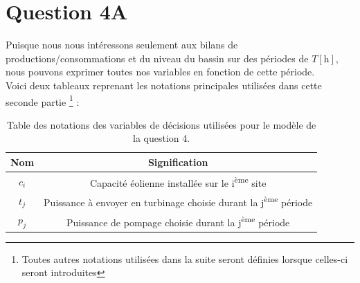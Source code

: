\documentclass{article}
\newcommand{\unit}[1]{[\mathrm{#1}]}
\begin{document}
\section*{Question 4A}
Puisque nous nous intéressons seulement aux bilans de productions/consommations et du niveau du bassin
sur des périodes de $T \unit{h}$, nous pouvons exprimer toutes nos variables en fonction de cette période.\\
Voici deux tableaux reprenant les notations principales utilisées dans cette seconde partie \footnote{Toutes autres notations utilisées dans la suite seront définies lorsque celles-ci seront introduites} : 

\begin{table}[h!]
    \centering
    \renewcommand{\arraystretch}{1.5}%
    \begin{tabular}{|c || c |} 
        \hline
        Nom & Signification\\
        \hline\hline
        $c_i$ & Capacité éolienne installée sur le i\textsuperscript{ème} site\\
        $t_j$ & Puissance à envoyer en turbinage choisie durant la j\textsuperscript{ème} période\\
        $p_j$ & Puissance de pompage choisie durant la j\textsuperscript{ème} période\\
        \hline
    \end{tabular}
    \caption{Table des notations des variables de décisions utilisées pour le modèle de la question 4.}
    \label{table:notations_variables_4}
\end{table}
\end{document}
